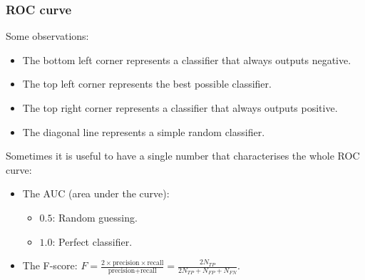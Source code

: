 \documentclass{beamer}
\begin{document}
\begin{frame}
    \frametitle{ROC curve}
    Some observations:
    \begin{itemize}
        \item The bottom left corner represents a classifier that always outputs negative.
        \item The top left corner represents the best possible classifier.
        \item The top right corner represents a classifier that always outputs positive.
        \item The diagonal line represents a simple random classifier.
    \end{itemize}
    Sometimes it is useful to have a single number that characterises the whole ROC curve:
    \begin{itemize}
        \item The AUC (area under the curve):
        \begin{itemize}
            \item $0.5$: Random guessing.
            \item $1.0$: Perfect classifier.
        \end{itemize}
        \item The F-score: $F=\frac{2\times\textrm{precision}\times\textrm{recall}}{\textrm{precision}+\textrm{recall}}=\frac{2N_{TP}}{2N_{TP}+N_{FP}+N_{FN}}$.
    \end{itemize}
\end{frame}
\end{document}
